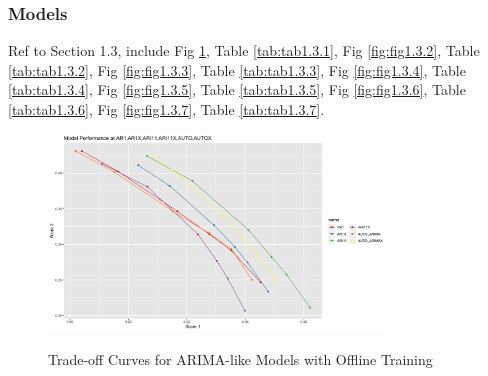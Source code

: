 \documentclass{article}
\begin{document}
\subsubsection{Models}
Ref to Section 1.3, include Fig \ref{fig:fig1.3.1}, Table \ref{tab:tab1.3.1}, Fig \ref{fig:fig1.3.2}, Table \ref{tab:tab1.3.2}, Fig \ref{fig:fig1.3.3}, Table \ref{tab:tab1.3.3}, Fig \ref{fig:fig1.3.4}, Table \ref{tab:tab1.3.4}, Fig \ref{fig:fig1.3.5}, Table \ref{tab:tab1.3.5}, Fig \ref{fig:fig1.3.6}, Table \ref{tab:tab1.3.6}, Fig \ref{fig:fig1.3.7}, Table \ref{tab:tab1.3.7}.

\begin{figure}[htbp]
    \caption{Trade-off Curves for ARIMA-like Models with Offline Training}
    \centering
    \includegraphics[width = 0.8\textwidth]{images/ModelPerformanceatAR1,AR1X,ARI11,ARI11X,AUTO,AUTOX.png}
    \label{fig:fig1.3.1}
\end{figure}
\end{document}
